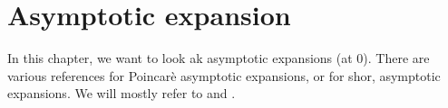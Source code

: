 \chapter{Asymptotic expansion}
\begin{comment}
  \begin{multicols}{2}
    ´classical'
    \begin{itemize}
      \item \cite[60]{sabbah_cimpa90} Chapter II.2.2
        \begin{itemize}
          \item \cite{sabbah2000equations}
        \end{itemize}
      \item \textbf{\textcolor{blue}{Van der Put:
            \cite[Chapter 7]{van2003galois}: Exact Asymptotics}}
      \item \cite{majima1984asymptotic}
      \item \cite{Balser2000Formal}
      \item \cite{Loday1994}
      \item \textbf{\textcolor{blue}{\cite{Loday2014} Chapter 2}}
    \end{itemize}
    \columnbreak
    ´sheafical'
    \begin{itemize}
      \item \textbf{\textcolor{red}{\cite[II.5]{sabbah2007isomonodromic}}}
    \end{itemize}
  \end{multicols}
  \TODO:
  \begin{itemize}
    \item \cite{sibuya1990Linear} Appendix A.3
  \end{itemize}
\end{comment}
In this chapter, we want to look ak asymptotic expansions (at $0$).
There are various references for Poincarè asymptotic expansions, or for shor,
asymptotic expansions.
We will mostly refer to \cite[chapter 2]{Loday2014} and
\cite[chapter 7]{van2003galois}.


